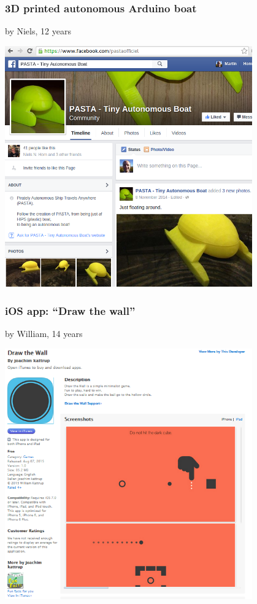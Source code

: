 \documentclass{beamer}
\begin{document}
\begin{frame}
  \frametitle{3D printed autonomous Arduino boat}
  by Niels, 12 years

  \vspace{2mm}
  \centerline{\includegraphics[width=0.8\textwidth]{imagery/pasta_autonomous_submarine}}
\end{frame}

\begin{frame}
  \frametitle{iOS app: ``Draw the wall''}
  by William, 14 years

  \vspace{2mm}
  \centerline{\includegraphics[width=0.8\textwidth]{imagery/drawthewall}}
\end{frame}
\end{document}
